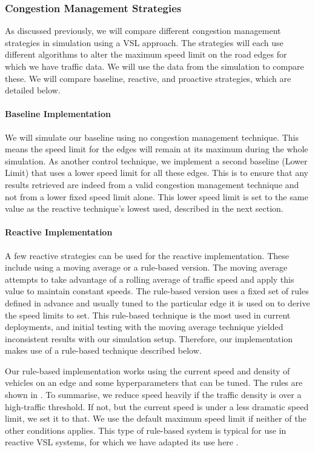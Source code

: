 \subsubsection{Congestion Management Strategies}
As discussed previously, we will compare different congestion management strategies in simulation using a VSL approach. The strategies will each use different algorithms to alter the maximum speed limit on the road edges for which we have traffic data. We will use the data from the simulation to compare these. We will compare baseline, reactive, and proactive strategies, which are detailed below.

\paragraph{Baseline Implementation}
We will simulate our baseline using no congestion management technique. This means the speed limit for the edges will remain at its maximum during the whole simulation. As another control technique, we implement a second baseline (Lower Limit) that uses a lower speed limit for all these edges. This is to ensure that any results retrieved are indeed from a valid congestion management technique and not from a lower fixed speed limit alone. This lower speed limit is set to the same value as the reactive technique's lowest used, described in the next section.

\paragraph{Reactive Implementation}
A few reactive strategies can be used for the reactive implementation. These include using a moving average or a rule-based version. The moving average attempts to take advantage of a rolling average of traffic speed and apply this value to maintain constant speeds. The rule-based version uses a fixed set of rules defined in advance and usually tuned to the particular edge it is used on to derive the speed limits to set. This rule-based technique is the most used in current deployments, and initial testing with the moving average technique yielded inconsistent results with our simulation setup. Therefore, our implementation makes use of a rule-based technique described below.

Our rule-based implementation works using the current speed and density of vehicles on an edge and some hyperparameters that can be tuned. The rules are shown in . To summarise, we reduce speed heavily if the traffic density is over a high-traffic threshold. If not, but the current speed is under a less dramatic speed limit, we set it to that. We use the default maximum speed limit if neither of the other conditions applies. This type of rule-based system is typical for use in reactive VSL systems, for which we have adapted its use here \cite{grumert_characteristics_2018, allaby_variable_2007}.

